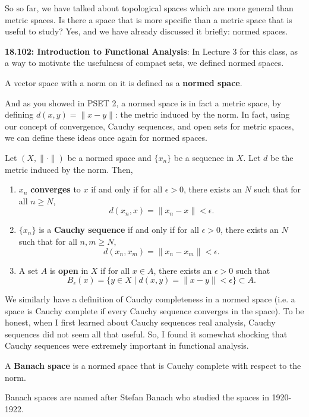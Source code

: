 So so far, we have talked about topological spaces which are more general than metric spaces. Is there a space that is more specific than a metric space that is useful to study? Yes, and we have already discussed it briefly: normed spaces.

\textbf{18.102: Introduction to Functional Analysis}: In Lecture 3 for this class, as a way to motivate the usefulness of compact sets, we defined normed spaces.

\begin{recall}
A vector space with a norm on it is defined as a \textbf{normed space}.
\end{recall}

And as you showed in PSET 2, a normed space is in fact a metric space, by defining $d(x,y) = \lVert x-y\rVert$: the metric induced by the norm. In fact, using our concept of convergence, Cauchy sequences, and open sets for metric spaces, we can define these ideas once again for normed spaces.
\begin{definition}
Let $(X,\lVert\cdot \rVert)$ be a normed space and $\{x_n\}$ be a sequence in $X$. Let $d$ be the metric induced by the norm. Then, 
\begin{enumerate}
    \item $x_n$ \textbf{converges} to $x$ if and only if for all $\epsilon >0$, there exists an $N$ such that for all $n\geq N$, 
    \[
    d(x_n,x) = \lVert x_n - x\rVert < \epsilon.
    \]
    \item $\{x_n\}$ is a \textbf{Cauchy sequence} if and only if for all $\epsilon >0$, there exists an $N$ such that for all $n,m \geq N$, 
    \[
    d(x_n, x_m) = \lVert x_n - x_m\rVert < \epsilon.
    \]
    \item A set $A$ is \textbf{open} in $X$ if for all $x\in A$, there exists an $\epsilon >0$ such that 
    \[
    B_\epsilon(x) = \{y\in X \mid d(x,y) = \lVert x-y\rVert < \epsilon\} \subset A.
    \]
\end{enumerate}
\end{definition}

We similarly have a definition of Cauchy completeness in a normed space (i.e. a space is Cauchy complete if every Cauchy sequence converges in the space). To be honest, when I first learned about Cauchy sequences real analysis, Cauchy sequences did not seem all that useful. So, I found it somewhat shocking that Cauchy sequences were extremely important in functional analysis.

\begin{definition}
A \textbf{Banach space} is a normed space that is Cauchy complete with respect to the norm.
\end{definition}
Banach spaces are named after Stefan Banach who studied the spaces in 1920-1922.

